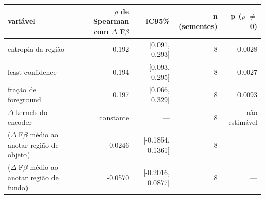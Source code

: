 \begin{tabular}{lrrrr}
\hline
variável & $\rho$ de Spearman com $\Delta$ F$\beta$ & IC95\% & n (sementes) & p ($\rho$ $\neq$ 0) \\
\hline
entropia da região & 0.192 & [0.091, 0.293] & 8 & 0.0028 \\
least confidence & 0.194 & [0.093, 0.295] & 8 & 0.0027 \\
fração de foreground & 0.197 & [0.066, 0.329] & 8 & 0.0093 \\
$\Delta$ kernels do encoder & constante & --- & 8 & não estimável \\
($\Delta$ F$\beta$ médio ao anotar região de objeto) & -0.0246 & [-0.1854, 0.1361] & 8 & --- \\
($\Delta$ F$\beta$ médio ao anotar região de fundo) & -0.0570 & [-0.2016, 0.0877] & 8 & --- \\
\hline
\end{tabular}
